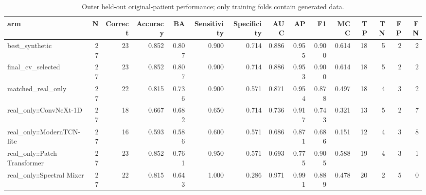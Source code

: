 \begin{table}[t]
\centering
\caption{Outer held-out original-patient performance; only training folds contain generated data.}
\footnotesize
\begin{tabular}{lrrrrrrrrrrrrrr}
\toprule
arm & N & Correct & Accuracy & BA & Sensitivity & Specificity & AUC & AP & F1 & MCC & TP & TN & FP & FN \\
\midrule
best\_synthetic & 27 & 23 & 0.852 & 0.807 & 0.900 & 0.714 & 0.886 & 0.955 & 0.900 & 0.614 & 18 & 5 & 2 & 2 \\
final\_cv\_selected & 27 & 23 & 0.852 & 0.807 & 0.900 & 0.714 & 0.886 & 0.953 & 0.900 & 0.614 & 18 & 5 & 2 & 2 \\
matched\_real\_only & 27 & 22 & 0.815 & 0.736 & 0.900 & 0.571 & 0.871 & 0.954 & 0.878 & 0.497 & 18 & 4 & 3 & 2 \\
real\_only::ConvNeXt-1D & 27 & 18 & 0.667 & 0.682 & 0.650 & 0.714 & 0.736 & 0.917 & 0.743 & 0.321 & 13 & 5 & 2 & 7 \\
real\_only::ModernTCN-lite & 27 & 16 & 0.593 & 0.586 & 0.600 & 0.571 & 0.686 & 0.871 & 0.686 & 0.151 & 12 & 4 & 3 & 8 \\
real\_only::Patch Transformer & 27 & 23 & 0.852 & 0.761 & 0.950 & 0.571 & 0.693 & 0.775 & 0.905 & 0.588 & 19 & 4 & 3 & 1 \\
real\_only::Spectral Mixer & 27 & 22 & 0.815 & 0.643 & 1.000 & 0.286 & 0.971 & 0.991 & 0.889 & 0.478 & 20 & 2 & 5 & 0 \\
\bottomrule
\end{tabular}
\end{table}
